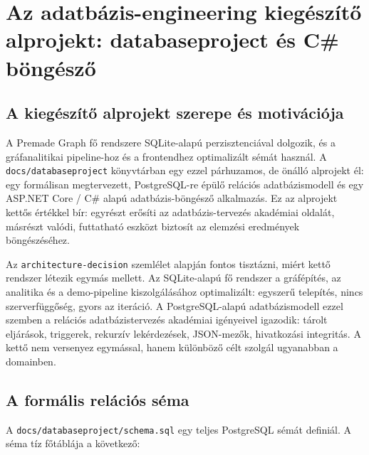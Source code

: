 ﻿\documentclass[a4paper,12pt]{report}
\begin{document}
\chapter{Az adatbázis-engineering kiegészítő alprojekt: databaseproject és C\# böngésző}

\section{A kiegészítő alprojekt szerepe és motivációja}

A Premade Graph fő rendszere SQLite-alapú perzisztenciával dolgozik, és a gráfanalitikai pipeline-hoz és a frontendhez optimalizált sémát használ. A \texttt{docs/databaseproject} könyvtárban egy ezzel párhuzamos, de önálló alprojekt él: egy formálisan megtervezett, PostgreSQL-re épülő relációs adatbázismodell és egy ASP.NET Core / C\# alapú adatbázis-böngésző alkalmazás. Ez az alprojekt kettős értékkel bír: egyrészt erősíti az adatbázis-tervezés akadémiai oldalát, másrészt valódi, futtatható eszközt biztosít az elemzési eredmények böngészéséhez.

Az \texttt{architecture-decision} szemlélet alapján fontos tisztázni, miért kettő rendszer létezik egymás mellett. Az SQLite-alapú fő rendszer a gráfépítés, az analitika és a demo-pipeline kiszolgálásához optimalizált: egyszerű telepítés, nincs szerverfüggőség, gyors az iteráció. A PostgreSQL-alapú adatbázismodell ezzel szemben a relációs adatbázistervezés akadémiai igényeivel igazodik: tárolt eljárások, triggerek, rekurzív lekérdezések, JSON-mezők, hivatkozási integritás. A kettő nem versenyez egymással, hanem különböző célt szolgál ugyanabban a domainben.

\section{A formális relációs séma}

A \texttt{docs/databaseproject/schema.sql} egy teljes PostgreSQL sémát definiál. A séma tíz főtáblája a következő:
\end{document}
